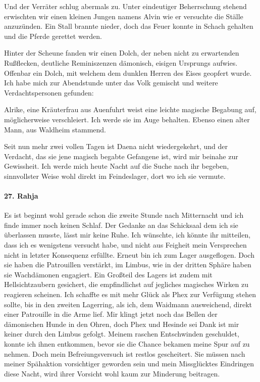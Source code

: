 Und der Verräter schlug abermals zu. Unter eindeutiger Beherrschung stehend erwischten wir einen kleinen Jungen namens Alvin wie er versuchte die Ställe anzuzünden. Ein Stall brannte nieder, doch das Feuer konnte in Schach gehalten und die Pferde gerettet werden.

Hinter der Scheune fanden wir einen Dolch, der neben nicht zu erwartenden Rußflecken, deutliche Reminiszenzen dämonisch, eisigen Ursprungs aufwies. Offenbar ein Dolch, mit welchem dem dunklen Herren des Eises geopfert wurde.
Ich habe mich zur Abendstunde unter das Volk gemischt und weitere Verdachtspersonen gefunden:

Alrike, eine Kräuterfrau aus Auenfuhrt weist eine leichte magische Begabung auf, möglicherweise verschleiert. Ich werde sie im Auge behalten. Ebenso einen alter Mann, aus Waldheim stammend.

Seit nun mehr zwei vollen Tagen ist Daena nicht wiedergekehrt, und der Verdacht, das sie jene magisch begabte Gefangene ist, wird mir beinahe zur Gewissheit. Ich werde mich heute Nacht auf die Suche nach ihr begeben, sinnvollster Weise wohl direkt im Feindeslager, dort wo ich sie vermute.

\paragraph{27. Rahja}
Es ist beginnt wohl gerade schon die zweite Stunde nach Mitternacht und ich finde immer noch keinen Schlaf. Der Gedanke an das Schicksaal dem ich sie überlassen musste, lässt mir keine Ruhe. Ich wünschte, ich könnte ihr mitteilen, dass ich es wenigstens versucht habe, und nicht aus Feigheit mein Versprechen nicht in letzter Konsequenz erfüllte. Erneut bin ich zum Lager ausgeflogen. Doch sie haben die Patrouillen verstärkt, im Limbus, wie in der dritten Sphäre haben sie Wachdämonen engagiert. Ein Großteil des Lagers ist zudem mit Hellsichtzaubern gesichert, die empfindlichst auf jegliches magisches Wirken zu reagieren scheinen. Ich schaffte es mit mehr Glück als Phex zur Verfügung stehen sollte, bis in den zweiten Lagerring, als ich, dem Waidmann ausweichend, direkt einer Patrouille in die Arme lief. Mir klingt jetzt noch das Bellen der dämonischen Hunde in den Ohren, doch Phex und Hesinde sei Dank ist mir keiner durch den Limbus gefolgt. Meinem raschen Entschwinden geschuldet, konnte ich ihnen entkommen, bevor sie die Chance bekamen meine Spur auf zu nehmen. Doch mein Befreiungsversuch ist restlos gescheitert. Sie müssen nach meiner Spähaktion vorsichtiger geworden sein und mein Missglücktes Eindringen diese Nacht, wird ihrer Vorsicht wohl kaum zur Minderung beitragen.

